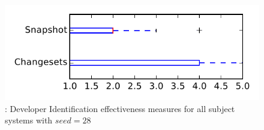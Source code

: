
\begin{figure}
\centering
\includegraphics[height=0.4\textheight]{figures/dit_seed/rq1_tiny_28}
\caption{\rtwo: Developer Identification effectiveness measures for all subject systems with $seed=28$}
\label{fig:dit_seed:rq1:tiny}
\end{figure}

